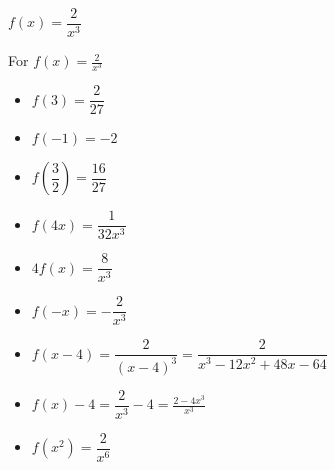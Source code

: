 {$f(x) = \dfrac{2}{x^{3}}$}
{For $f(x) = \frac{2}{x^3}$ 

\begin{multicols}{2}
\begin{itemize}
\item $f(3) = \dfrac{2}{27}$
\item $f(-1) = -2$
\item $f\left(\dfrac{3}{2} \right) = \dfrac{16}{27}$
\item  $f(4x) = \dfrac{1}{32x^3}$
\item $4f(x) = \dfrac{8}{x^3}$
\item $f(-x) = -\dfrac{2}{x^3}$
\item  $f(x-4) = \dfrac{2}{(x-4)^3}=\dfrac{2}{x^3-12x^2+48x-64}$
\item $f(x) - 4 = \dfrac{2}{x^3} - 4= \frac{2-4x^3}{x^3}$
\item  $f\left(x^2\right) = \dfrac{2}{x^6}$
\end{itemize}
\end{multicols}

}